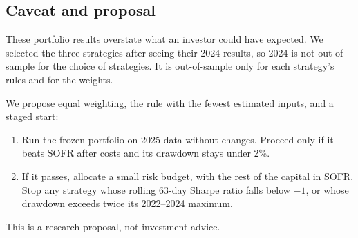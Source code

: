 \documentclass[main.tex]{subfiles}
\begin{document}
\subsection{Caveat and proposal}
These portfolio results overstate what an investor could have expected. We selected the three strategies after seeing their 2024 results, so 2024 is not out-of-sample for the choice of strategies. It is out-of-sample only for each strategy's rules and for the weights.

We propose equal weighting, the rule with the fewest estimated inputs, and a staged start:
\begin{enumerate}
  \item Run the frozen portfolio on 2025 data without changes. Proceed only if it beats SOFR after costs and its drawdown stays under 2\%.
  \item If it passes, allocate a small risk budget, with the rest of the capital in SOFR. Stop any strategy whose rolling 63-day Sharpe ratio falls below $-1$, or whose drawdown exceeds twice its 2022--2024 maximum.
\end{enumerate}
This is a research proposal, not investment advice.
\end{document}
